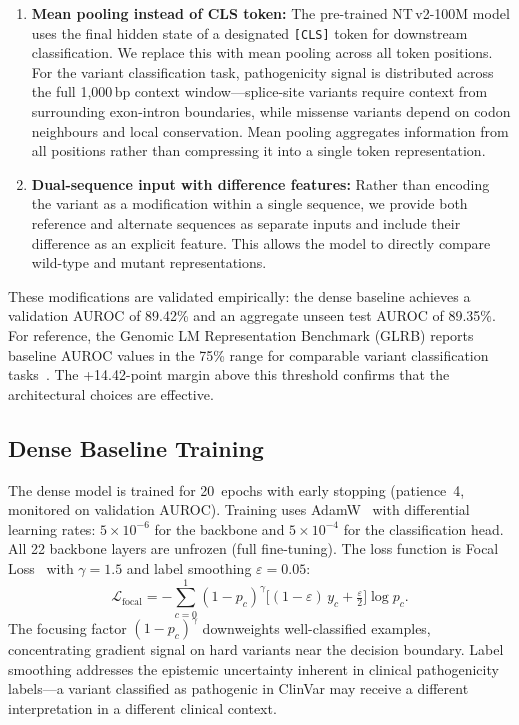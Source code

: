 \documentclass[journal]{IEEEtran}
\newcommand{\ntv}{NT\,v2-100M}
\begin{document}
\begin{enumerate}
  \item \textbf{Mean pooling instead of CLS token:}
        The pre-trained \ntv{} model uses the final hidden
        state of a designated \texttt{[CLS]} token for
        downstream classification.
        We replace this with mean pooling across all token
        positions.
        For the variant classification task, pathogenicity
        signal is distributed across the full 1,000\,bp
        context window---splice-site variants require
        context from surrounding exon-intron boundaries,
        while missense variants depend on codon neighbours
        and local conservation.
        Mean pooling aggregates information from all positions
        rather than compressing it into a single token
        representation.

  \item \textbf{Dual-sequence input with difference features:}
        Rather than encoding the variant as a modification
        within a single sequence, we provide both reference
        and alternate sequences as separate inputs and
        include their difference as an explicit feature.
        This allows the model to directly compare wild-type
        and mutant representations.
\end{enumerate}

These modifications are validated empirically: the dense baseline
achieves a validation AUROC of 89.42\% and an aggregate unseen
test AUROC of 89.35\%.
For reference, the Genomic LM Representation Benchmark (GLRB)
reports baseline AUROC values in the 75\% range for comparable
variant classification tasks~\cite{Abad-Grau2016,Mandrekar2010}.
The +14.42-point margin above this threshold confirms that
the architectural choices are effective.

\subsection{Dense Baseline Training}

The dense model is trained for 20~epochs with early stopping
(patience~4, monitored on validation AUROC).
Training uses AdamW~\cite{Loshchilov2019} with differential
learning rates: $5 \times 10^{-6}$ for the backbone and
$5 \times 10^{-4}$ for the classification head.
All 22 backbone layers are unfrozen (full fine-tuning).
The loss function is Focal Loss~\cite{Lin2017} with
$\gamma = 1.5$ and label smoothing $\varepsilon = 0.05$:
\begin{equation}
  \mathcal{L}_{\text{focal}} =
  -\sum_{c=0}^{1}
  (1 - p_c)^{\gamma}
  \bigl[(1-\varepsilon)\,y_c + \tfrac{\varepsilon}{2}\bigr]
  \log p_c.
  \label{eq:focal}
\end{equation}
The focusing factor $(1-p_c)^\gamma$ downweights well-classified
examples, concentrating gradient signal on hard variants near
the decision boundary.
Label smoothing addresses the epistemic uncertainty inherent in
clinical pathogenicity labels---a variant classified as
pathogenic in ClinVar may receive a different interpretation
in a different clinical context.
\end{document}
